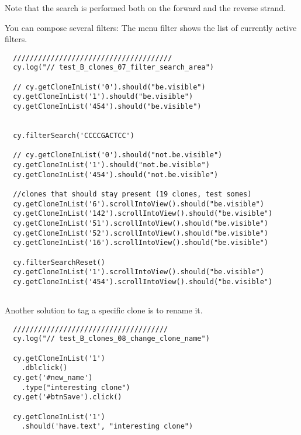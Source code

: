 Note that the search is performed both on the forward and the reverse strand.

You can compose several filters:
The menu filter shows the list of currently active filters.

\begin{verbatim}
  //////////////////////////////////////
  cy.log("// test_B_clones_07_filter_search_area")

  // cy.getCloneInList('0').should("be.visible")
  cy.getCloneInList('1').should("be.visible")
  cy.getCloneInList('454').should("be.visible")


  cy.filterSearch('CCCCGACTCC')

  // cy.getCloneInList('0').should("not.be.visible")
  cy.getCloneInList('1').should("not.be.visible")
  cy.getCloneInList('454').should("not.be.visible")

  //clones that should stay present (19 clones, test somes)
  cy.getCloneInList('6').scrollIntoView().should("be.visible")
  cy.getCloneInList('142').scrollIntoView().should("be.visible")
  cy.getCloneInList('51').scrollIntoView().should("be.visible")
  cy.getCloneInList('52').scrollIntoView().should("be.visible")
  cy.getCloneInList('16').scrollIntoView().should("be.visible")

  cy.filterSearchReset()
  cy.getCloneInList('1').scrollIntoView().should("be.visible")
  cy.getCloneInList('454').scrollIntoView().should("be.visible")


\end{verbatim}  
\bigskip

Another solution to tag a specific clone is to rename it.
\begin{verbatim}
  /////////////////////////////////////
  cy.log("// test_B_clones_08_change_clone_name")

  cy.getCloneInList('1')
    .dblclick()
  cy.get('#new_name')
    .type("interesting clone")
  cy.get('#btnSave').click()

  cy.getCloneInList('1')
    .should('have.text', "interesting clone")

\end{verbatim}

